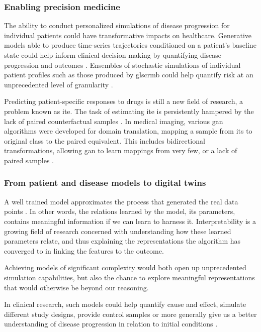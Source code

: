         \subsubsection{Enabling precision medicine}\label{sec:precision_med}
    
            The ability to conduct personalized simulations of disease progression for individual patients could have transformative impacts on healthcare. Generative models able to produce time-series trajectories conditioned on a patient's baseline state could help inform clinical decision making by quantifying disease progression and outcomes \cite{walsh2020generating, Fisher2019}. Ensembles of stochastic simulations of individual patient profiles such as those produced by gls{crmb} could help quantify risk at an unprecedented level of granularity \cite{Fisher2019}.\par
            Predicting patient-specific responses to drugs is still a new field of research, a problem known as \gls{ite}. The task of estimating \gls{ite} is persistently hampered by the lack of paired counterfactual samples \cite{Yoon2018-ite, chu2019treatment}. In medical imaging, various \gls{gan} algorithms were developed for domain translation, mapping a sample from its to original class to the paired equivalent. This includes bidirectional transformations, allowing \gls{gan} to learn mappings from very few, or a lack of paired samples \cite{Wolterink2017DeepMT}.
    
        \subsubsection{From patient and disease models to digital twins}\label{sec:models_twins}
    
            A well trained model approximates the process that generated the real data points \cite{esteban2017real}. In other words, the relations learned by the model, its parameters, contains meaningful information if we can learn to harness it. Interpretability is a growing field of research concerned with understanding how these learned parameters relate, and thus explaining the representations the algorithm has converged to in linking the features to the outcome.\par
            Achieving models of significant complexity would both open up unprecedented simulation capabilities, but also the chance to explore meaningful representations that would otherwise be beyond our reasoning.\par 
            In clinical research, such models could help quantify cause and effect, simulate different study designs, provide control samples or more generally give us a better understanding of disease progression in relation to initial conditions \cite{Fisher2019, yahi2017generative, walsh2020generating}.\par
            
